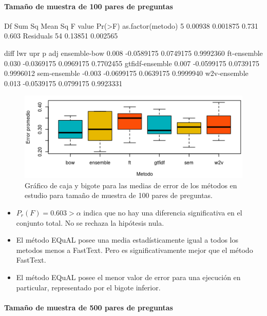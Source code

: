 \paragraph{Tamaño de muestra de 100 pares de preguntas}

\begin{rc}
                 Df  Sum Sq  Mean Sq F value Pr(>F)
as.factor(metodo)  5 0.00938 0.001875   0.731  0.603
Residuals         54 0.13851 0.002565
\end{rc}

\begin{rc}
                 diff        lwr       upr     p adj
ensemble-bow     0.008 -0.0589175 0.0749175 0.9992360
ft-ensemble      0.030 -0.0369175 0.0969175 0.7702455
gtfidf-ensemble  0.007 -0.0599175 0.0739175 0.9996012
sem-ensemble    -0.003 -0.0699175 0.0639175 0.9999940
w2v-ensemble     0.013 -0.0539175 0.0799175 0.9923331
\end{rc}

\begin{figure}
	\centering
	\includegraphics[width=0.7\linewidth]{10_resultados/imagenes/anova_100}
	\caption{Gráfico de caja y bigote para las medias de error de los métodos en estudio para tamaño de muestra de 100 pares de preguntas.}
	\label{fig:anova100}
\end{figure}

\begin{itemize}
	\item \(P_r(F) = 0.603 > \alpha\) indica que no hay una diferencia significativa en el conjunto total. No se rechaza la hipótesis nula.
	\item El método EQuAL posee una media estadísticamente igual a todos los metodos menos a FastText. Pero es significativamente mejor que el método FastText.
	\item El método EQuAL posee el menor valor de error para una ejecución en particular, representado por el bigote inferior.
\end{itemize}

\paragraph{Tamaño de muestra de 500 pares de preguntas}

